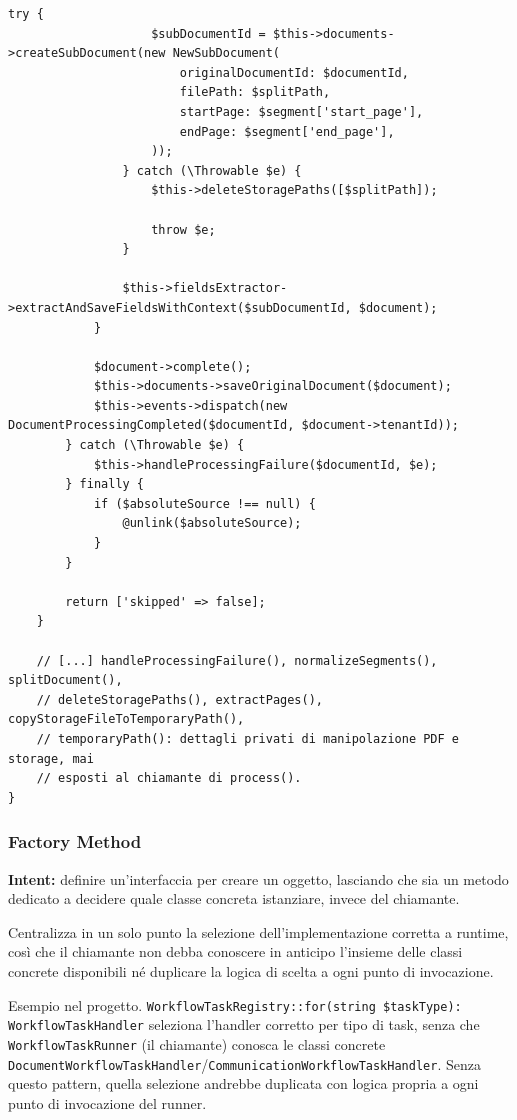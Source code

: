 \documentclass[a4paper,12pt]{article}
\begin{document}
\begin{sloppypar}
\begin{lstlisting}[style=phplisting, caption={ProcessDocumentService -- Facade su repository, storage, gateway AI, eventi ed heartbeat dietro process()}]
                try {
                    $subDocumentId = $this->documents->createSubDocument(new NewSubDocument(
                        originalDocumentId: $documentId,
                        filePath: $splitPath,
                        startPage: $segment['start_page'],
                        endPage: $segment['end_page'],
                    ));
                } catch (\Throwable $e) {
                    $this->deleteStoragePaths([$splitPath]);

                    throw $e;
                }

                $this->fieldsExtractor->extractAndSaveFieldsWithContext($subDocumentId, $document);
            }

            $document->complete();
            $this->documents->saveOriginalDocument($document);
            $this->events->dispatch(new DocumentProcessingCompleted($documentId, $document->tenantId));
        } catch (\Throwable $e) {
            $this->handleProcessingFailure($documentId, $e);
        } finally {
            if ($absoluteSource !== null) {
                @unlink($absoluteSource);
            }
        }

        return ['skipped' => false];
    }

    // [...] handleProcessingFailure(), normalizeSegments(), splitDocument(),
    // deleteStoragePaths(), extractPages(), copyStorageFileToTemporaryPath(),
    // temporaryPath(): dettagli privati di manipolazione PDF e storage, mai
    // esposti al chiamante di process().
}
\end{lstlisting}

\subsubsection{Factory Method}

\textbf{Intent:} definire un'interfaccia per creare un oggetto, lasciando che sia un metodo dedicato a decidere quale classe concreta istanziare, invece del chiamante.

Centralizza in un solo punto la selezione dell'implementazione corretta a runtime, così che il chiamante non debba conoscere in anticipo l'insieme delle classi concrete disponibili né duplicare la logica di scelta a ogni punto di invocazione.

Esempio nel progetto. \texttt{WorkflowTaskRegistry::for(string \$taskType): WorkflowTaskHandler} seleziona l'handler corretto per tipo di task, senza che \texttt{WorkflowTaskRunner} (il chiamante) conosca le classi concrete \texttt{DocumentWorkflowTaskHandler}/\texttt{CommunicationWorkflowTaskHandler}. Senza questo pattern, quella selezione andrebbe duplicata con logica propria a ogni punto di invocazione del runner.


\end{sloppypar}
\end{document}
